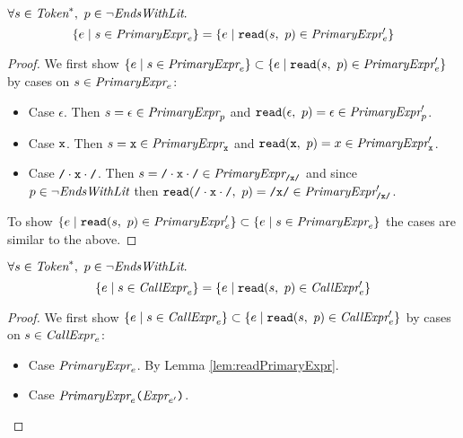 \documentclass[preprint,10pt]{sigplanconf}
\begin{document}
\begin{lemma}\mbox{}

  \( \forall s \in \textit{Token}^{*},~p \in \neg \textit{EndsWithLit}. \)
  \[
  \{ e \mid s \in \textit{PrimaryExpr}_{e} \}
  =
  \{ e \mid \texttt{read}(s,~p) \in \textit{PrimaryExpr}_{e}' \}
  \]
\end{lemma}
\begin{proof}
  We first show 
  \( \{ e \mid s \in \textit{PrimaryExpr}_{e} \} \subset
  \{ e \mid \texttt{read}(s,~p) \in \textit{PrimaryExpr}_{e}' \}
  \)
  by cases on \( s \in \textit{PrimaryExpr}_{e} \):
  \begin{itemize}

  \item Case \( \epsilon \). Then \( s = \epsilon \in
    \textit{PrimaryExpr}_{p} \) and \(
    \texttt{read}(\epsilon,~p) = \epsilon \in \textit{PrimaryExpr}_{p}' \).

  \item Case \( \texttt{x} \). Then \( s = \texttt{x} \in
    \textit{PrimaryExpr}_{\texttt{x}} \) and \( \texttt{read}(\texttt{x},~p) = x \in
    \textit{PrimaryExpr}_{\texttt{x}}' \).

  \item Case \( \texttt{/} \cdot \texttt{x} \cdot \texttt{/} \). Then \( s = \texttt{/} \cdot \texttt{x} \cdot \texttt{/} \in
    \textit{PrimaryExpr}_{\texttt{/x/}} \) and since \( p \in \neg \textit{EndsWithLit} \)
    then \( \texttt{read}(\texttt{/} \cdot \texttt{x} \cdot \texttt{/},~p) = \texttt{/x/} \in \textit{PrimaryExpr}_{\texttt{/x/}}' \).

  \end{itemize}
  To show 
  \( 
  \{ e \mid \texttt{read}(s,~p) \in \textit{PrimaryExpr}_{e}' \}
  \subset
  \{ e \mid s \in \textit{PrimaryExpr}_{e} \} 
  \) the cases are similar to the above.
\end{proof}

\begin{lemma}\mbox{}

  \( \forall s \in \textit{Token}^{*},~p \in \neg \textit{EndsWithLit}. \)
  \[
  \{ e \mid s \in \textit{CallExpr}_{e} \}
  =
  \{ e \mid \texttt{read}(s,~p) \in \textit{CallExpr}_{e}' \}
  \]
\end{lemma}
\begin{proof}
  We first show 
  \( \{ e \mid s \in \textit{CallExpr}_{e} \} \subset
  \{ e \mid \texttt{read}(s,~p) \in \textit{CallExpr}_{e}' \}
  \)
  by cases on \( s \in \textit{CallExpr}_{e} \):
  \begin{itemize}

  \item Case \( \textit{PrimaryExpr}_{e} \). By Lemma \ref{lem:readPrimaryExpr}.

  \item Case \( \textit{PrimaryExpr}_{e} \texttt{(}\textit{Expr}_{e'}\texttt{)} \).
  \end{itemize}
\end{proof}
\end{document}
